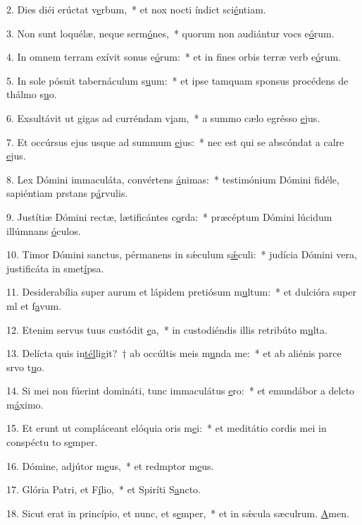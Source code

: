 2. Dies diéi erúctat v\uline{e}rbum,~* et nox nocti índict sci\uline{é}ntiam.\par 
3. Non sunt loquélæ, neque serm\uline{ó}nes,~* quorum non audiántur vocs e\uline{ó}rum.\par 
4. In omnem terram exívit sonus e\uline{ó}rum:~* et in fines orbis terræ verb e\uline{ó}rum.\par 
5. In sole pósuit tabernáculum s\uline{u}um:~* et ipse tamquam sponsus procédens de thálmo s\uline{u}o.\par 
6. Exsultávit ut gigas ad curréndam v\uline{i}am,~* a summo cælo egrésso \uline{e}jus.\par 
7. Et occúrsus ejus usque ad summum \uline{e}jus:~* nec est qui se abscóndat a calre \uline{e}jus.\par 
8. Lex Dómini immaculáta, convértens \uline{á}nimas:~* testimónium Dómini fidéle, sapiéntiam prstans p\uline{á}rvulis.\par 
9. Justítiæ Dómini rectæ, lætificántes c\uline{o}rda:~* præcéptum Dómini lúcidum illúmnans \uline{ó}culos.\par 
10. Timor Dómini sanctus, pérmanens in sǽculum s\uline{ǽ}culi:~* judícia Dómini vera, justificáta in smet\uline{í}psa.\par 
11. Desiderabília super aurum et lápidem pretiósum m\uline{u}ltum:~* et dulcióra super ml et f\uline{a}vum.\par 
12. Etenim servus tuus custódit \uline{e}a,~* in custodiéndis illis retribúto m\uline{u}lta.\par 
13. Delícta quis in\uline{tél}ligit?~† ab occúltis meis m\uline{u}nda me:~* et ab aliénis parce srvo t\uline{u}o.\par 
14. Si mei non fúerint domináti, tunc immaculátus \uline{e}ro:~* et emundábor a delcto m\uline{á}ximo.\par 
15. Et erunt ut compláceant elóquia oris m\uline{e}i:~* et meditátio cordis mei in conspéctu to s\uline{e}mper.\par 
16. Dómine, adjútor m\uline{e}us,~* et redmptor m\uline{e}us.\par 
17. Glória Patri, et F\uline{í}lio,~* et Spiríti S\uline{a}ncto.\par 
18. Sicut erat in princípio, et nunc, et s\uline{e}mper,~* et in sǽcula sæculrum. \uline{A}men.\par 
